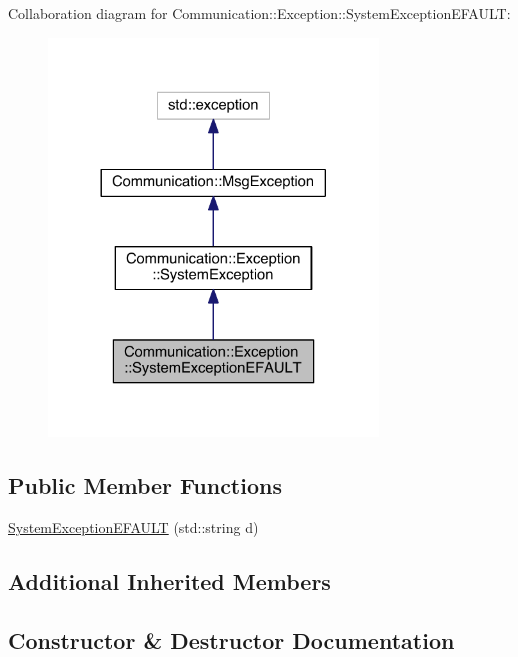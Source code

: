 Collaboration diagram for Communication\+:\+:Exception\+:\+:System\+Exception\+E\+F\+A\+U\+L\+T\+:\nopagebreak
\begin{figure}[H]
\begin{center}
\leavevmode
\includegraphics[width=248pt]{class_communication_1_1_exception_1_1_system_exception_e_f_a_u_l_t__coll__graph}
\end{center}
\end{figure}
\subsection*{Public Member Functions}
\begin{DoxyCompactItemize}
\item 
\hyperlink{class_communication_1_1_exception_1_1_system_exception_e_f_a_u_l_t_a077be6b1f9d893f466adfa4eb2dad65c}{System\+Exception\+E\+F\+A\+U\+L\+T} (std\+::string d)
\end{DoxyCompactItemize}
\subsection*{Additional Inherited Members}


\subsection{Constructor \& Destructor Documentation}
\hypertarget{class_communication_1_1_exception_1_1_system_exception_e_f_a_u_l_t_a077be6b1f9d893f466adfa4eb2dad65c}{}
